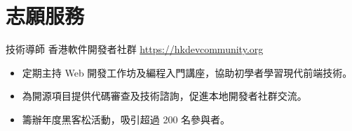 \documentclass[a4paper, serif, 10pt]{moderncv}
\begin{document}
\section{志願服務}

        {技術導師}
        {香港軟件開發者社群}
        {\url{https://hkdevcommunity.org}}
        {}
        {\begin{itemize}
\item 定期主持 Web 開發工作坊及編程入門講座，協助初學者學習現代前端技術。
\item 為開源項目提供代碼審查及技術諮詢，促進本地開發者社群交流。
\item 籌辦年度黑客松活動，吸引超過 200 名參與者。
\end{itemize}}
    
\end{document}
